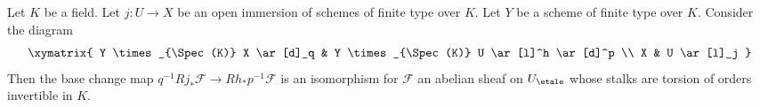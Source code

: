 %
\begin{lemma}
\label{lemma-kunneth-localize-on-X}
Let $K$ be a field. Let $j : U \to X$ be an open immersion of
schemes of finite type over $K$. Let $Y$ be a scheme of finite type
over $K$. Consider the diagram
$$
\xymatrix{
Y \times_{\Spec(K)} X \ar[d]_q  &
Y \times_{\Spec(K)} U \ar[l]^h \ar[d]^p \\
X & U \ar[l]_j
}
$$
Then the base change map $q^{-1}Rj_*\mathcal{F} \to Rh_*p^{-1}\mathcal{F}$
is an isomorphism for $\mathcal{F}$ an abelian sheaf on $U_\etale$
whose stalks are torsion of orders invertible in $K$.
\end{lemma}

